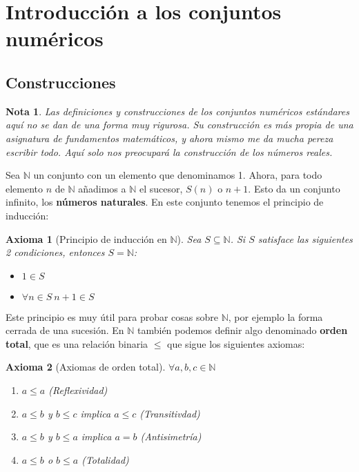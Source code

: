 \documentclass{article}
\author{NyKi}
\date{Diciembre 2024}
\newtheorem{axiom}{Axioma}
\newtheorem{note}{Nota}
\begin{document}
\section{Introducción a los conjuntos numéricos}

\subsection{Construcciones}

\begin{note}
Las definiciones y construcciones de los conjuntos numéricos estándares aquí no se dan de una forma muy rigurosa. Su construcción es más propia de una asignatura de fundamentos matemáticos, y ahora mismo me da mucha pereza escribir todo. Aquí solo nos preocupará la construcción de los números reales.
\end{note}

Sea $\mathbb{N}$ un conjunto con un elemento que denominamos 1. Ahora, para todo elemento $n$ de $\mathbb{N}$ añadimos a $\mathbb{N}$ el sucesor, $S(n)$ o $n+1$. Esto da un conjunto infinito, los \textbf{números naturales}. En este conjunto tenemos el principio de inducción:

\begin{axiom}[Principio de inducción en $\mathbb{N}$]
Sea $S \subseteq \mathbb{N}$. Si $S$ satisface las siguientes 2 condiciones, entonces $S = \mathbb{N}$:
\begin{itemize}
\item
$1 \in S$
\item
$\forall n \in S \ n+1 \in S$
\end{itemize}
\end{axiom}

Este principio es muy útil para probar cosas sobre $\mathbb{N}$, por ejemplo la forma cerrada de una sucesión. En $\mathbb{N}$ también podemos definir algo denominado \textbf{orden total}, que es una relación binaria  $\leq$ que sigue los siguientes axiomas:
\begin{axiom}[Axiomas de orden total]
$\forall a,b,c \in \mathbb{N}$
\begin{enumerate}
	\item
	$a \leq a$ (Reflexividad)
	\item
	$a \leq b$ y $b \leq c$ implica $a \leq c$ (Transitivdad)
	\item
	$a \leq b$ y $b \leq a$ implica $a = b$ (Antisimetría)
	\item
	$a \leq b$ o $b \leq a$ (Totalidad)
\end{enumerate}
\end{axiom}
\end{document}
